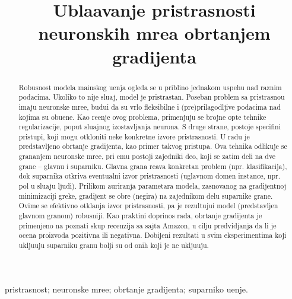 \documentclass[cyr]{simposium}
\begin{document}
\begin{frontmatter}

\title{ Ubla\zh avanje pristrasnosti neuronskih mre\zh a obrtanjem gradijenta}

\author{{ }}
\address{Matemati\ch ki fakultet, Univerzitet u Beogradu, Student{}ski trg 16, Beograd\\
}



\maketitle

\begin{abstract}
    Robusnost modela ma\sh inskog u\ch enja ogleda se u pribli\zh no jednakom uspehu nad raznim podacima. Ukoliko to nije slu\ch aj, model je pristrastan. Poseban problem sa pristrasno\sh \cc u imaju neuronske mre\zh e, budu\cc i da su vrlo fleksibilne i (pre)prilagodljive podacima nad kojima su obu\ch ene. Kao re\sh enje ovog problema, primenjuju se brojne op\sh te tehnike regularizacije, poput slu\ch ajnog izostavljanja neurona. S druge strane, postoje specifi\ch ni pristupi, koji mogu otkloniti neke konkretne izvore pristrasnosti. U radu je predstavljeno obrtanje gradijenta, kao primer takvog pristupa. Ova tehnika odlikuje se grananjem neuronske mre\zh e, pri \ch emu postoji zajedni\ch ki deo, koji se zatim deli na dve grane -- glavnu i suparni\ch ku. Glavna grana re\sh ava konkretan problem (npr. klasifikacija), dok suparni\ch ka otkriva eventualni izvor pristrasnosti (uglavnom domen instance, npr. pol u slu\ch aju ljudi). Prilikom a\zh uriranja parametara modela, zasnovanog na gradijentnoj minimizaciji gre\sh ke, gradijent se obr\cc e (negira) na zajedni\ch kom delu suparni\ch ke grane. Ovime se efektivno otklanja izvor pristrasnosti, pa je rezultuju\cc i model (predstavljen glavnom granom) robusniji. Kao prakti\ch ni doprinos rada, obrtanje gradijenta je primenjeno na poznati skup recenzija sa sajta Amazon, u cilju predvidjanja da li je ocena proizvoda pozitivna ili negativna. Dobijeni rezultati u svim eksperimentima koji uklju\ch uju suparni\ch ku granu bolji su od onih koji je ne uklju\ch uju.
\end{abstract}
\begin{keyword}
   pristrasnost; neuronske mre\zh e; obrtanje gradijenta; suparni\ch ko u\ch enje.
\end{keyword}
\end{frontmatter}
\end{document}
